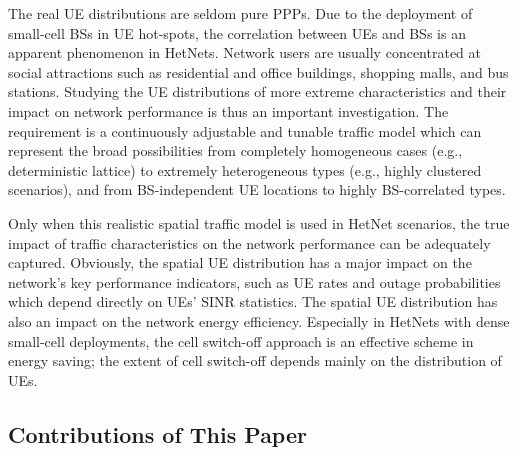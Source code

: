 \documentclass[journal]{IEEEtran}
\begin{document}
The real UE distributions are seldom pure PPPs. Due to the deployment of small-cell BSs in UE hot-spots, the correlation between UEs and BSs is an apparent phenomenon in HetNets. Network users are usually concentrated at social attractions such as residential and office buildings, shopping malls, and bus stations. Studying the UE distributions of more extreme characteristics and their impact on network performance is thus an important investigation. The requirement is a continuously adjustable and tunable traffic model which can represent the broad possibilities from completely homogeneous cases (e.g., deterministic lattice) to extremely heterogeneous types (e.g., highly clustered scenarios), and from BS-independent UE locations to highly BS-correlated types.

Only when this realistic spatial traffic model is used in HetNet scenarios, the true impact of traffic characteristics on the network performance can be adequately captured. Obviously, the spatial UE distribution has a major impact on the network's key  performance indicators, such as UE rates and outage probabilities which depend directly on UEs' SINR statistics. The spatial UE distribution has also an impact on the network energy efficiency. Especially in HetNets with dense small-cell deployments, the cell switch-off approach \cite{hasan2011green,chen2011fundamental,yanikomeroglu2014novel} is an effective scheme in energy saving; the extent of cell switch-off depends mainly on the distribution of UEs.












\subsection{Contributions of This Paper}
\end{document}
